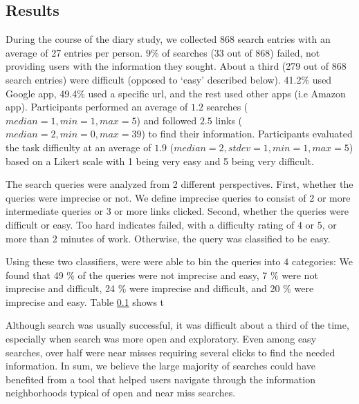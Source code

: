 \subsection{Results}

During the course of the diary study, we collected $868$ search entries with an average of 27 entries per person. 9\% of searches (33 out of 868) failed, not providing users with the information they sought. About a third (279 out of 868 search entries) were difficult (opposed to `easy' described below). 41.2\% used Google app, 49.4\% used a specific url, and the rest used other apps (i.e Amazon app). Participants performed an average of $1.2$ searches ($median=1, min =1, max=5$) and followed $2.5$ links ($median=2, min=0, max=39$) to find their information. Participants evaluated the task difficulty at an average of $1.9$ ($median=2,  stdev=1, min=1, max=5$) based on a Likert scale with 1 being very easy and 5 being very difficult. 

The search queries were analyzed from 2 different perspectives. First, whether the queries were imprecise or not. We define imprecise queries to consist of 2 or more intermediate queries or 3 or more links clicked. Second, whether the queries were difficult or easy. Too hard indicates failed, with a difficulty rating of $4$ or $5$, or more than $2$ minutes of work. Otherwise, the query was classified to be easy. 

Using these two classifiers, were were able to bin the queries into $4$ categories: We found that 49 \% of the queries were not imprecise and easy, 7 \% were not imprecise and difficult, 24 \% were imprecise and difficult, and 20 \% were imprecise and easy. Table \ref{} shows t

Although search was usually successful, it was difficult about a third of the time, especially when search was more open and exploratory. Even among easy searches, over half were near misses requiring several clicks to find the needed information. In sum, we believe the large majority of searches could have benefited from a tool that helped users navigate through the information neighborhoods typical of open and near miss searches. 



